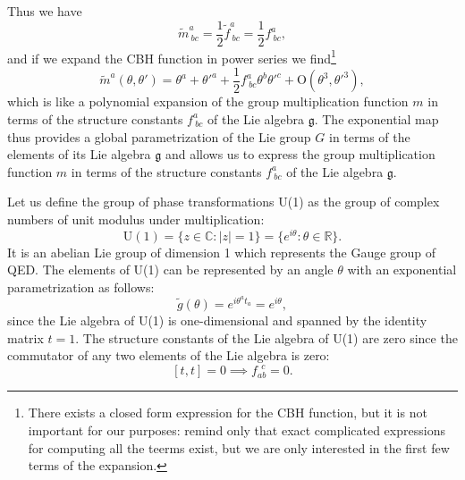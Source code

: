 Thus we have
\[
    \tilde{m}^a_{\ bc} = \frac{1}{2} \tilde{f}^a_{\ bc} = \frac{1}{2} f^a_{\ bc},
\]
and if we expand the CBH function in power series we find\footnote{There exists a closed form expression for the CBH function, but it is not important for our purposes: remind only that exact complicated  expressions for computing all the teerms exist, but we are only interested in the first few terms of the expansion.}
\[
    \tilde{m}^a(\theta, \theta') = \theta^a + \theta'^a + \frac{1}{2} f^a_{\ bc} \theta^b \theta'^c + \mathrm{O}(\theta^3, \theta'^3),
\]
which is like a polynomial expansion of the group multiplication function \(m\) in terms of the structure constants \(f^a_{\ bc}\) of the Lie algebra \(\mathfrak{g}\). The exponential map thus provides a global parametrization of the Lie group \(G\) in terms of the elements of its Lie algebra \(\mathfrak{g}\) and allows us to express the group multiplication function \(m\) in terms of the structure constants \(f^a_{\ bc}\) of the Lie algebra \(\mathfrak{g}\).

\begin{example}
    Let us define the group of phase transformations U(1) as the group of complex numbers of unit modulus under multiplication:
    \[
        \mathrm{U}(1) = \{ z \in \mathbb{C} : |z| = 1 \} = \{ e^{i\theta} : \theta \in \mathbb{R} \}.
    \]
    It is an abelian Lie group of dimension 1 which represents the Gauge group of QED.
    The elements of U(1) can be represented by an angle \(\theta\) with an exponential parametrization as follows:
    \[
        \tilde{g}(\theta) = e^{i\theta^a t_a} = e^{i\theta},
    \]
    since the Lie algebra of U(1) is one-dimensional and spanned by the identity matrix \(t = 1\). The structure constants of the Lie algebra of U(1) are zero since the commutator of any two elements of the Lie algebra is zero:
    \[
        [t, t] = 0 \implies f_{ab}^{\ \ c} = 0.
    \]
\end{example}

